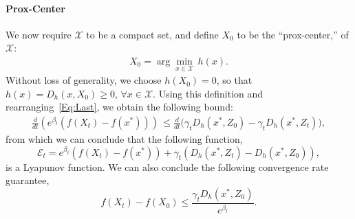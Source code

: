 \documentclass[11pt]{article}
\theoremstyle{plain}
\newcommand{\E}{{\mathcal E}}
\newcommand{\X}{{\mathcal X}}
\begin{document}
\paragraph{Prox-Center}  We now require $\X$ to be a compact set,  and  define $X_0$ to be the ``prox-center,'' of $\X$:
\begin{align*}
X_0 = \arg\min_{x \in \X} \,h(x).
\end{align*}
Without loss of generality, we choose $h(X_0) = 0$, so that $h(x) =D_h(x,X_0) \geq 0, \, \forall x \in \X$.
Using this definition and rearranging~\eqref{Eq:Last}, we obtain the following bound:
%
\begin{align*}
 \frac{d}{dt}\left( e^{\beta_t}\left(f(X_t) - f(x^\ast)\right)\right) \,\leq  \frac{d}{dt} \Big( \gamma_t D_h(x^\ast, Z_0) -\gamma_t D_h(x^\ast,Z_t) \Big) ,
\end{align*}
from which we can conclude that the following function, 
\begin{equation}
\E_t = e^{\beta_t}( f(X_t) - f(x^\ast)) + \gamma_t (D_h(x^\ast, Z_t) - D_h(x^\ast, Z_0)),
\end{equation}
is a Lyapunov function. We can also conclude the following convergence rate guarantee, 
\begin{equation}\label{Eq:DualAvgBound}
f(X_t) - f(X_0) \leq \frac{\gamma_t D_h(x^\ast,Z_0)}{e^{\beta_t}}.
\end{equation}
\end{document}
